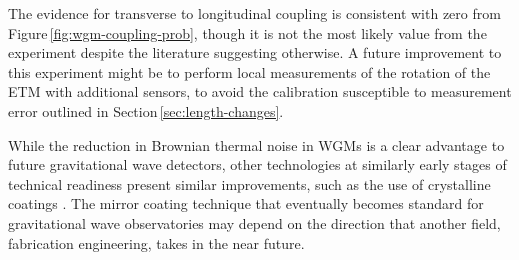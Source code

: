 The evidence for transverse to longitudinal coupling is consistent with zero from Figure\,\ref{fig:wgm-coupling-prob}, though it is not the most likely value from the experiment despite the literature suggesting otherwise. A future improvement to this experiment might be to perform local measurements of the rotation of the \gls{ETM} with additional sensors, to avoid the calibration susceptible to measurement error outlined in Section\,\ref{sec:length-changes}.

While the reduction in Brownian thermal noise in \glspl{WGM} is a clear advantage to future gravitational wave detectors, other technologies at similarly early stages of technical readiness present similar improvements, such as the use of crystalline coatings \cite{Cole2013}. The mirror coating technique that eventually becomes standard for gravitational wave observatories may depend on the direction that another field, fabrication engineering, takes in the near future.